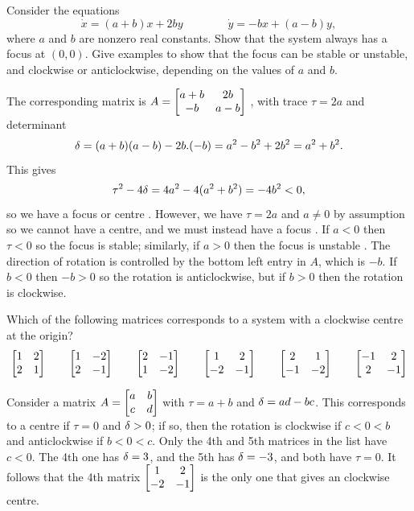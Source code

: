 \documentclass[a4paper]{amsart}
\begin{document}
\begin{exercise}\label{ex-variable-focus}
 Consider the equations 
 \[ \dot{x} = (a+b)x + 2by \hspace{4em}
    \dot{y} = -bx + (a-b)y, 
 \]
 where $a$ and $b$ are nonzero real constants.  Show that the system
 always has a focus at $(0,0)$.  Give examples to show that the
 focus can be stable or unstable, and clockwise or anticlockwise,
 depending on the values of $a$ and $b$.
\end{exercise}
\begin{solution}
 The corresponding matrix is $A=\left[\begin{matrix} a+b&2b\\ -b&a-b\end{matrix}\right]$ , with trace
 $\tau=2a$ and determinant
 \[ \delta = (a+b)(a-b) - 2b.(-b) = a^2-b^2 + 2b^2 = a^2+b^2 . \]
 This gives
 \[ \tau^2-4\delta = 4a^2 - 4(a^2+b^2) = -4b^2 < 0,  \]
 so we have a focus or centre .  However, we have $\tau=2a$ and
 $a\neq 0$ by assumption so we cannot have a centre, and we must
 instead have a focus .  If $a<0$ then $\tau<0$ so the focus is
 stable; similarly, if $a>0$ then the focus is unstable .  The
 direction of rotation is controlled by the bottom left entry in
 $A$, which is $-b$.  If $b<0$ then $-b>0$ so the rotation is
 anticlockwise, but if $b>0$ then the rotation is clockwise.
\end{solution}

\begin{exercise}\label{ex-find-cw-centre}
 Which of the following matrices corresponds to a system
   with a clockwise centre at the origin?
   \[ \left[\begin{matrix}  1 &  2 \\  2 &  1 \end{matrix}\right] \qquad
      \left[\begin{matrix}  1 & -2 \\  2 & -1 \end{matrix}\right] \qquad
      \left[\begin{matrix}  2 & -1 \\  1 & -2 \end{matrix}\right] \qquad
      \left[\begin{matrix}  1 &  2 \\ -2 & -1 \end{matrix}\right] \qquad
      \left[\begin{matrix}  2 &  1 \\ -1 & -2 \end{matrix}\right] \qquad
      \left[\begin{matrix} -1 &  2 \\  2 & -1 \end{matrix}\right]
   \]
\end{exercise}
\begin{solution}
 Consider a matrix $A=\left[\begin{matrix} a&b\\ c&d\end{matrix}\right]$ with
 $\tau=a+b$ and $\delta=ad-bc$.  This corresponds to a centre if
 $\tau=0$ and $\delta>0$; if so, then the rotation is clockwise
 if $c<0<b$ and anticlockwise if $b<0<c$.  Only the 4th and 5th
 matrices in the list have $c<0$.  The 4th one has $\delta=3$, and the
 5th has $\delta=-3$, and both have $\tau=0$.  It follows that the 4th
 matrix $\left[\begin{matrix} 1&2\\-2&-1\end{matrix}\right]$ is the only one that gives an
 clockwise centre.
\end{solution}
\end{document}
